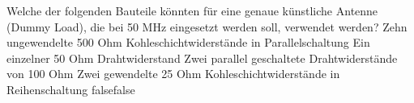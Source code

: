     {Welche der folgenden Bauteile könnten für eine genaue künstliche Antenne (Dummy Load), die bei 50 MHz eingesetzt werden soll, verwendet werden?}
    {Zehn ungewendelte 500 Ohm Kohleschichtwiderstände in Parallelschaltung}
    {Ein einzelner 50 Ohm Drahtwiderstand}
    {Zwei parallel geschaltete Drahtwiderstände von 100 Ohm}
    {Zwei gewendelte 25 Ohm Kohleschichtwiderstände in Reihenschaltung}
    {false}{false}